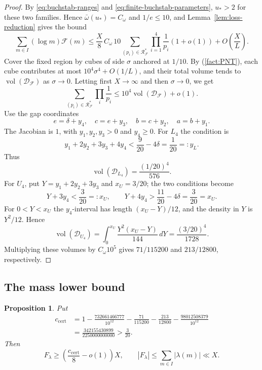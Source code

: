 \documentclass{amsart}
\newtheorem{proposition}[lemma]{Proposition}
\newcounter{fact}
\numberwithin{equation}{section}
\numberwithin{table}{section}
\newcommand{\vol}{\operatorname{vol}}
\newcommand{\ccert}{c_{\mathrm{cert}}}
\begin{document}
\begin{proof}
By \eqref{eq:buchstab-ranges} and \eqref{eq:finite-buchstab-parameters},
$u_*>2$ for these two families. Hence $\bar\omega(u_*)=C_\omega$ and
$1/e\le10$, and Lemma~\ref{lem:loss-reduction} gives the bound
\[
\sum_{m\in I}(\log m)\mathcal F(m)
\le\frac X8\,C_\omega\,10
\sum_{(p_i)\in\mathcal R_{\mathcal F}^{*}}
\prod_{i=1}^4\frac1{p_i}(1+o(1))+O\left(\frac XL\right).
\]
Cover the fixed region by cubes of side $\sigma$ anchored at $1/10$.
By (\ref{fact:PNT}), each cube contributes at most
$10^4\sigma^4+O(1/L)$, and their total volume tends to
$\vol(\mathcal D_{\mathcal F})$ as $\sigma\to0$.
Letting first $X\to\infty$ and then $\sigma\to0$, we get
\[
\sum_{(p_i)\in\mathcal R_{\mathcal F}^{*}}\prod_i\frac1{p_i}
\le10^4\operatorname{vol}(\mathcal D_{\mathcal F})+o(1).
\]
Use the gap coordinates
\[
e=\delta+y_4,\quad c=e+y_3,\quad b=c+y_2,\quad a=b+y_1.
\]
The Jacobian is $1$, with $y_1,y_2,y_3>0$ and $y_4\ge0$.
For $L_4$ the condition is
\[
y_1+2y_2+3y_3+4y_4<\frac9{20}-4\delta=\frac1{20}=:y_L.
\]
Thus
\begin{equation}\label{eq:L4-volume}
\vol(\mathcal D_{L_4})=\frac{(1/20)^4}{576}.
\end{equation}
For $U_4$, put $Y=y_1+2y_2+3y_3$ and $x_U=3/20$; the two conditions
become
\[
Y+3y_4<\frac3{20}=:x_U,
\qquad
Y+4y_4>\frac{11}{20}-4\delta=\frac3{20}=x_U.
\]
For $0<Y<x_U$ the $y_4$-interval has length $(x_U-Y)/12$, and the
density in $Y$ is $Y^2/12$. Hence
\begin{equation}\label{eq:U4-volume}
\vol(\mathcal D_{U_4})
=\int_0^{x_U}\frac{Y^2(x_U-Y)}{144}\,dY
=\frac{(3/20)^4}{1728}.
\end{equation}
Multiplying these volumes by $C_\omega10^5$ gives
$71/115200$ and $213/12800$, respectively.
\end{proof}

\subsection{The mass lower bound}

\begin{proposition}\label{prop:mass}
Put
\begin{equation}\label{eq:ccert}
\begin{split}
\ccert
&=1-\frac{732661466777}{10^{12}}-\frac{71}{115200}
-\frac{213}{12800}-\frac{98012508379}{10^{12}}\\
&=\frac{342155430899}{2250000000000}>\frac3{20}.
\end{split}
\end{equation}
Then
\begin{equation}\label{eq:mass-bound}
F_\lambda\ge\left(\frac{\ccert}{8}-o(1)\right)X,
\qquad |F_\lambda|\le\sum_{m\in I}|\lambda(m)|\ll X.
\end{equation}
\end{proposition}
\end{document}
